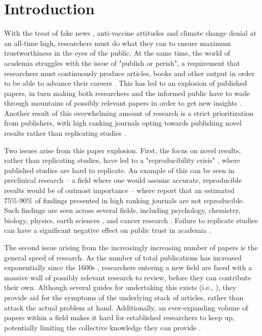 \section{Introduction}
\label{sec:introduction}
With the treat of fake news \parencite{Allcott_2017}, anti-vaccine attitudes \parencite{Lindholt_2021} and climate change denial \parencite{Anderegg_2010} at an all-time high, researchers must do what they can to ensure maximum trustworthiness in the eyes of the public. At the same time, the world of academia struggles with the issue of "publish or perish", a requirement that researchers must continuously produce articles, books and other output in order to be able to advance their careers \parencite{Grimes_2018}. This has led to an explosion of published papers, in turn making both researchers and the informed public have to wade through mountains of possibly relevant papers in order to get new insights \parencite{Bornmann_2015}. Another result of this overwhelming amount of research is a strict prioritization from publishers, with high ranking journals opting towards publishing novel results rather than replicating studies \parencite{Grimes_2018}.

Two issues arise from this paper explosion. First, the focus on novel results, rather than replicating studies, have led to a "reproducibility crisis" \parencite{Begley_2015}, where published studies are hard to replicate. An example of this can be seen in preclinical research -- a field where one would assume accurate, reproducible results would be of outmost importance -- where \textcite[p.1]{Begley_2015} report that an estimated 75\%-90\% of findings presented in high ranking journals are not reproducible. Such findings are seen across several fields, including psychology, chemistry, biology, physics, earth sciences \parencite{Baker_2016}, and cancer research \parencite{fMRI_no_author}. Failure to replicate studies can have a significant negative effect on public trust in academia \parencite{Grimes_2018}.

The second issue arising from the increasingly increasing number of papers is the general speed of research. As the number of total publications has increased exponentially since the 1600s \parencite{Bornmann_2015}, researchers entering a new field are faced with a massive wall of possibly relevant research to review, before they can contribute their own. Although several guides for undertaking this exists (i.e., \cite{Okoli_2015,Popenoe_2021,Nightingale_2009}), they provide aid for the symptoms of the underlying stack of articles, rather than attack the actual problem at hand. Additionally, an ever-expanding volume of papers within a field makes it hard for established researchers to keep up, potentially limiting the collective knowledge they can provide \parencite{Davies_2017}.

